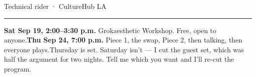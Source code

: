 \documentclass[10pt,letterpaper]{article}
\begin{document}
\fontsize{9.2pt}{11pt}\selectfont

{\fontsize{11pt}{12.5pt}\selectfont\color{acpink}Technical rider · CultureHub LA\par}

\vspace{0.16em}
{\color{acpink}\rule{\linewidth}{1.15pt}}

\vspace{0.04em}
\noindent\textbf{Sat Sep 19, 2:00–3:30 p.m.} Grokaesthetic Workshop. Free, open
to anyone.\quad\textbf{Thu Sep 24, 7:00 p.m.} Piece 1, the swap, Piece 2, then
talking, then everyone plays.\quad Thursday is set. Saturday isn't — I cut the
guest set, which was half the argument for two nights. Tell me which you want
and I'll re-cut the program.

\vspace{0.40em}
\end{document}
